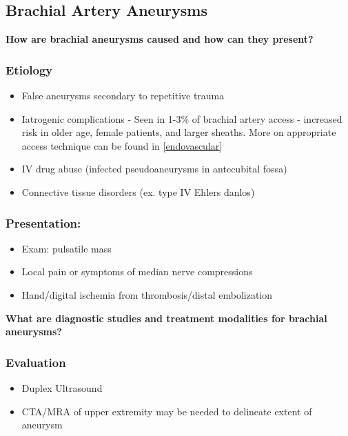 \documentclass[
]{book}
\begin{document}
\hypertarget{brachial-artery-aneurysms}{%
\subsection{Brachial Artery Aneurysms}\label{brachial-artery-aneurysms}}

\textbf{How are brachial aneurysms caused and how can they present?}

\hypertarget{etiology-2}{%
\subsubsection{Etiology}\label{etiology-2}}

\begin{itemize}
\item
  False aneurysms secondary to repetitive trauma
\item
  Iatrogenic complications - Seen in 1-3\% of brachial artery access -
  increased risk in older age, female patients, and larger
  sheaths.\citep{treitl2015} More on appropriate access technique can be
  found in \ref{endovascular}
\item
  IV drug abuse (infected pseudoaneurysms in antecubital fossa)
\item
  Connective tissue disorders (ex. type IV Ehlers danlos)
\end{itemize}

\hypertarget{presentation-2}{%
\subsubsection{Presentation:}\label{presentation-2}}

\begin{itemize}
\item
  Exam: pulsatile mass
\item
  Local pain or symptoms of median nerve compressions
\item
  Hand/digital ischemia from thrombosis/distal embolization
\end{itemize}

\textbf{What are diagnostic studies and treatment modalities for brachial
aneurysms?}

\hypertarget{evaluation-3}{%
\subsubsection{Evaluation}\label{evaluation-3}}

\begin{itemize}
\item
  Duplex Ultrasound
\item
  CTA/MRA of upper extremity may be needed to delineate extent of
  aneurysm
\end{itemize}
\end{document}
